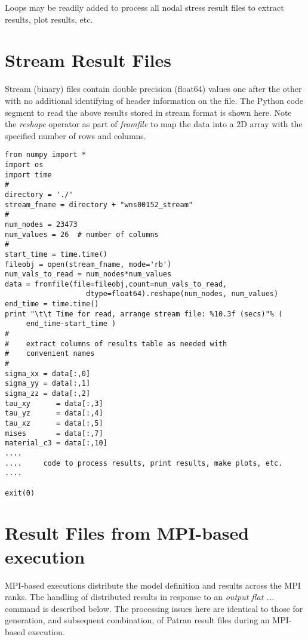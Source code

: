 \documentclass[10pt]{report}
\numberwithin{equation}{section}
\newcommand{\ti}{\emph}
\begin{document}
\noindent
Loops may be readily added to process all nodal stress result files to extract results,
plot results, etc.

%
%
\section{Stream Result Files }

Stream (binary) files contain double precision (float64) values one after the other with no
additional identifying of header  information on the file.  The Python code segment to read the
above results stored in stream format is shown here. Note the \ti{reshape} operator as part of
\ti{fromfile} to map the data into a 2D array with the specified number of rows and columns.


\small
\begin{verbatim}
from numpy import *
import os
import time
#
directory = './'
stream_fname = directory + "wns00152_stream"
#
num_nodes = 23473
num_values = 26  # number of columns
#
start_time = time.time()
fileobj = open(stream_fname, mode='rb')
num_vals_to_read = num_nodes*num_values
data = fromfile(file=fileobj,count=num_vals_to_read, 
                   dtype=float64).reshape(num_nodes, num_values)
end_time = time.time() 
print "\t\t Time for read, arrange stream file: %10.3f (secs)"% ( 
     end_time-start_time ) 
#
#    extract columns of results table as needed with 
#    convenient names
# 
sigma_xx = data[:,0] 
sigma_yy = data[:,1]  
sigma_zz = data[:,2]  
tau_xy      = data[:,3]  
tau_yz      = data[:,4]  
tau_xz      = data[:,5]
mises       = data[:,7]
material_c3 = data[:,10]
....
....     code to process results, print results, make plots, etc.
....

exit(0)
\end{verbatim}
\normalsize


%
%
\section{Result Files from MPI-based execution}

MPI-based executions distribute the model definition 
and results across the MPI ranks.
The handling of distributed results in response to an
\ti{output flat ...}
command is described below. The processing issues here are identical to those for
generation, and subsequent combination, of Patran result files during an MPI-based execution.
\end{document}
